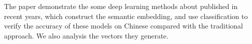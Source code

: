 \begin{abstractEN}

The paper demonstrate the some deep learning methods about  published in recent years, which construct the semantic embedding, and use classification to verify the accuracy of these models on Chinese compared with the traditional approach. We also analysis the vectors they generate.

\end{abstractEN}

